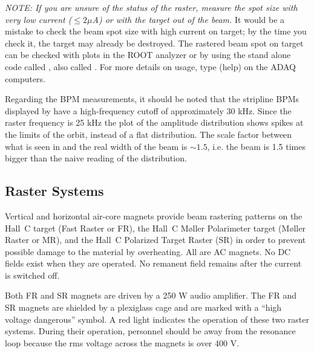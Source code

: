 {{{\it NOTE:  If you are unsure of the status of the raster,
measure the spot size with very low current ($\le 2 \mu$A) or with
the target out of the beam.}  It would be a mistake
to check the beam spot size with high current on target; by
the time you check it, the target may already be destroyed.
The rastered beam spot on target can be checked with
plots in the ROOT analyzer or by 
using the stand alone code called ,
also called .
For more details on usage, type  (help)
on the ADAQ computers.

Regarding the BPM measurements, it should be noted that 
the stripline BPMs displayed by  have a high-frequency 
cutoff of approximately 30 kHz.  Since the raster frequency is 25 kHz
the plot of the amplitude distribution shows spikes at the 
limits of the orbit, instead of a flat distribution.  The scale
factor between what is seen in  and the real width of the beam
is $\sim 1.5$, i.e. the beam is 1.5 times bigger than the naive
reading of the  distribution.
}


\subsection{Raster Systems}

Vertical and horizontal air-core magnets provide beam
rastering patterns on the Hall~C target (Fast Raster or FR), the
Hall~C M\o ller Polarimeter target (M\o ller Raster or MR), and the Hall~C 
Polarized Target Raster (SR) in order to prevent possible damage to the material by
overheating. All are AC magnets. No DC fields 
exist when they are operated. No remanent field remains after
the current is switched off.

Both FR and SR magnets are driven by a 250 W audio amplifier. The FR
and SR magnets are shielded by a plexiglass cage and are marked with a
``high voltage dangerous'' symbol.  A red light indicates the
operation of these two raster systems. During their operation, personnel
should be away from the resonance loop because the rms voltage across
the magnets is over 400 V.

}%
